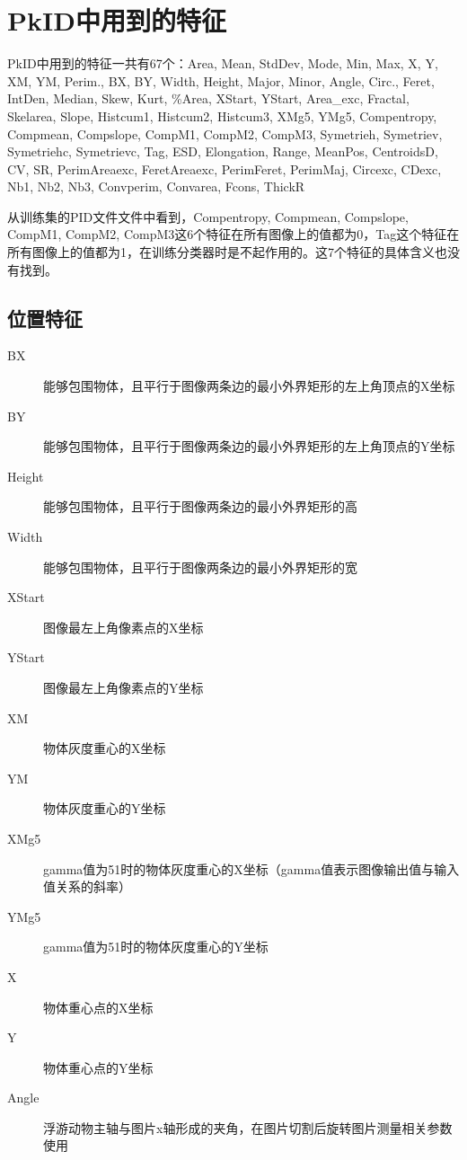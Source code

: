 \section{PkID中用到的特征}
PkID中用到的特征一共有67个：Area, Mean, StdDev, Mode, Min, Max, X, Y, XM, YM, Perim., BX, BY, Width, Height, Major, Minor, Angle, Circ., Feret, IntDen, Median, Skew, Kurt, \%Area, XStart, YStart, Area\_exc, Fractal, Skelarea, Slope, Histcum1, Histcum2, Histcum3, XMg5, YMg5, Compentropy, Compmean, Compslope, CompM1, CompM2, CompM3, Symetrieh, Symetriev, Symetriehc, Symetrievc, Tag, ESD, Elongation, Range, MeanPos, CentroidsD, CV, SR, PerimAreaexc, FeretAreaexc, PerimFeret, PerimMaj, Circexc, CDexc, {\color{blue}Nb1, Nb2, Nb3, Convperim, Convarea, Fcons, ThickR}

从训练集的PID文件文件中看到，Compentropy, Compmean, Compslope, CompM1, CompM2, CompM3这6个特征在所有图像上的值都为0，Tag这个特征在所有图像上的值都为1，在训练分类器时是不起作用的。这7个特征的具体含义也没有找到。

\subsection{位置特征}

\begin{description}
\item[BX] 能够包围物体，且平行于图像两条边的最小外界矩形的左上角顶点的X坐标 
\item[BY] 能够包围物体，且平行于图像两条边的最小外界矩形的左上角顶点的Y坐标 
\item[Height] 能够包围物体，且平行于图像两条边的最小外界矩形的高
\item[Width] 能够包围物体，且平行于图像两条边的最小外界矩形的宽
\item[XStart] 图像最左上角像素点的X坐标
\item[YStart] 图像最左上角像素点的Y坐标
\item[XM] 物体灰度重心的X坐标
\item[YM] 物体灰度重心的Y坐标
\item[XMg5] gamma值为51时的物体灰度重心的X坐标（gamma值表示图像输出值与输入值关系的斜率）
\item[YMg5] gamma值为51时的物体灰度重心的Y坐标
\item[X] 物体重心点的X坐标
\item[Y] 物体重心点的Y坐标
\item[Angle] 浮游动物主轴与图片x轴形成的夹角，在图片切割后旋转图片测量相关参数使用
\end{description}

